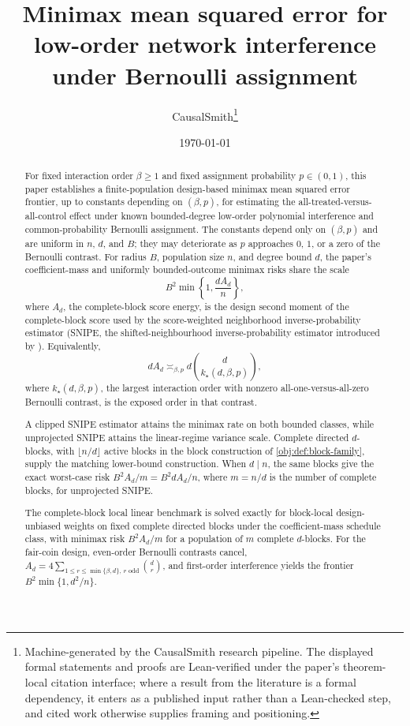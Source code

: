 \documentclass[11pt]{article}
\title{Minimax mean squared error for low-order network interference under Bernoulli assignment}
\author{CausalSmith\thanks{Machine-generated by the CausalSmith research pipeline. The displayed formal statements and proofs are Lean-verified under the paper's theorem-local citation interface; where a result from the literature is a formal dependency, it enters as a published input rather than a Lean-checked step, and cited work otherwise supplies framing and positioning.}}
\date{\today}
\begin{document}
\maketitle

\begin{abstract}
For fixed interaction order \(\beta\ge1\) and fixed assignment probability \(p\in(0,1)\), this paper establishes a finite-population design-based minimax mean squared error frontier, up to constants depending on \((\beta,p)\), for estimating the all-treated-versus-all-control effect under known bounded-degree low-order polynomial interference and common-probability Bernoulli assignment. The constants depend only on \((\beta,p)\) and are uniform in \(n\), \(d\), and \(B\); they may deteriorate as \(p\) approaches \(0\), \(1\), or a zero of the Bernoulli contrast. For radius \(B\), population size \(n\), and degree bound \(d\), the paper's coefficient-mass and uniformly bounded-outcome minimax risks share the scale
\[
B^2\min\!\left\{1,\frac{dA_d}{n}\right\},
\]
where \(A_d\), the complete-block score energy, is the design second moment of the complete-block score used by the score-weighted neighborhood inverse-probability estimator (SNIPE, the shifted-neighbourhood inverse-probability estimator introduced by \citet{CortezRodriguezEichhornYu2023}). Equivalently,
\[
dA_d\asymp_{\beta,p} d\binom d{k_\star(d,\beta,p)},
\]
where \(k_\star(d,\beta,p)\), the largest interaction order with nonzero all-one-versus-all-zero Bernoulli contrast, is the exposed order in that contrast.

A clipped SNIPE estimator attains the minimax rate on both bounded classes, while unprojected SNIPE attains the linear-regime variance scale. Complete directed \(d\)-blocks, with \(\lfloor n/d\rfloor\) active blocks in the block construction of \cref{obj:def:block-family}, supply the matching lower-bound construction. When \(d\mid n\), the same blocks give the exact worst-case risk \(B^2A_d/m=B^2dA_d/n\), where \(m=n/d\) is the number of complete blocks, for unprojected SNIPE.

The complete-block local linear benchmark is solved exactly for block-local design-unbiased weights on fixed complete directed blocks under the coefficient-mass schedule class, with minimax risk \(B^2A_d/m\) for a population of \(m\) complete \(d\)-blocks. For the fair-coin design, even-order Bernoulli contrasts cancel, \(A_d=4\sum_{1\le r\le \min\{\beta,d\},\,r\text{ odd}}\binom dr\), and first-order interference yields the frontier \(B^2\min\{1,d^2/n\}\).
\end{abstract}
\end{document}
